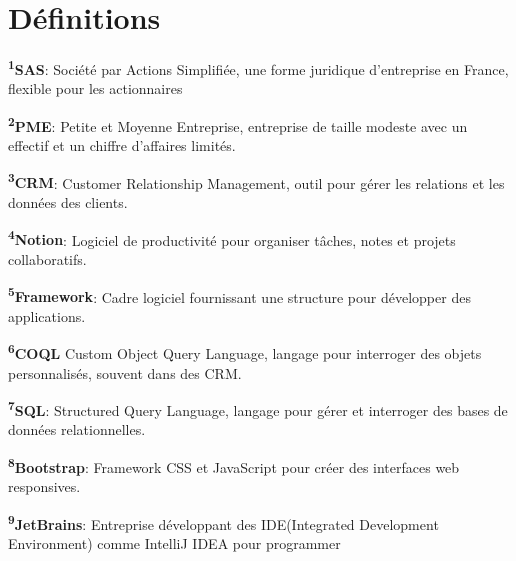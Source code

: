 \section*{Définitions}

\begin{small}
    \noindent \vspace{0.3cm}
    \textbf{\textsuperscript{1}SAS}: Société par Actions Simplifiée, une forme juridique d'entreprise en France, flexible pour les actionnaires \\\vspace{0.3cm}

    \textbf{\textsuperscript{2}PME}: Petite et Moyenne Entreprise, entreprise de taille modeste avec un effectif et un chiffre d'affaires limités. \\\vspace{0.3cm}

    \textbf{\textsuperscript{3}CRM}: Customer Relationship Management, outil pour gérer les relations et les données des clients.\\\vspace{0.3cm}

    \textbf{\textsuperscript{4}Notion}: Logiciel de productivité pour organiser tâches, notes et projets collaboratifs. \\\vspace{0.3cm}

    \textbf{\textsuperscript{5}Framework}: Cadre logiciel fournissant une structure pour développer des applications. \\\vspace{0.3cm}

     \textbf{\textsuperscript{6}COQL} Custom Object Query Language, langage pour interroger des objets personnalisés, souvent dans des CRM.\\\vspace{0.3cm}

     \textbf{\textsuperscript{7}SQL}: Structured Query Language, langage pour gérer et interroger des bases de données relationnelles. \\\vspace{0.3cm}

    \textbf{\textsuperscript{8}Bootstrap}: Framework CSS et JavaScript pour créer des interfaces web responsives. \\\vspace{0.3cm}

    \textbf{\textsuperscript{9}JetBrains}: Entreprise développant des IDE(Integrated Development Environment) comme IntelliJ IDEA pour programmer\\\vspace{0.3cm}


\end{small}
